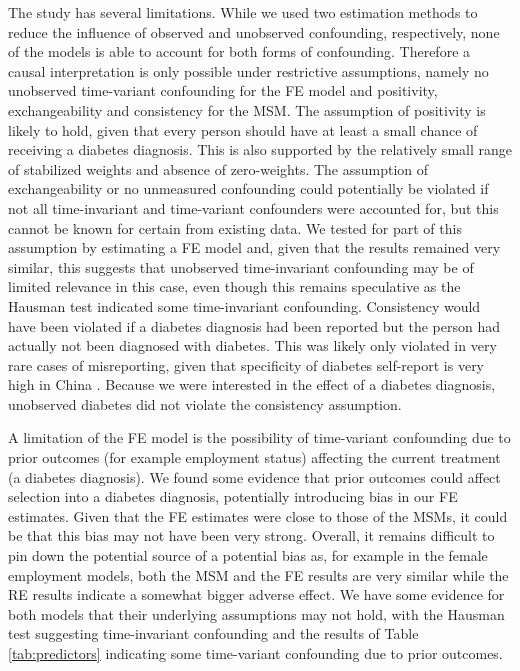 The study has several limitations. While we used two estimation methods to reduce the influence of observed and unobserved confounding, respectively, none of the models is able to account for both forms of confounding. Therefore a causal interpretation is only possible under restrictive assumptions, namely no unobserved time-variant confounding for the \ac{FE} model and positivity, exchangeability and consistency for the \ac{MSM}. The assumption of positivity is likely to hold, given that every person should have at least a small chance of receiving a diabetes diagnosis. This is also supported by the relatively small range of stabilized weights and absence of zero-weights. The assumption of exchangeability or no unmeasured confounding could potentially be violated if not all time-invariant and time-variant confounders were accounted for, but this cannot be known for certain from existing data. We tested for part of this assumption by estimating a \ac{FE} model and, given that the results remained very similar, this suggests that unobserved time-invariant confounding may be of limited relevance in this case, even though this remains speculative as the Hausman test indicated some time-invariant confounding. Consistency would have been violated if a diabetes diagnosis had been reported but the person had actually not been diagnosed with diabetes. This was likely only violated in very rare cases of misreporting, given that specificity of diabetes self-report is very high in China \autocite{Yuan2015}. Because we were interested in the effect of a diabetes diagnosis, unobserved diabetes did not violate the consistency assumption.

A limitation of the \ac{FE} model is the possibility of time-variant confounding due to prior outcomes (for example employment status) affecting the current treatment (a diabetes diagnosis). We found some evidence that prior outcomes could affect selection into a diabetes diagnosis, potentially introducing bias in our \ac{FE} estimates. Given that the \ac{FE} estimates were close to those of the \acp{MSM}, it could be that this bias may not have been very strong. Overall, it remains difficult to pin down the potential source of a potential bias as, for example in the female employment models, both the \ac{MSM} and the \ac{FE} results are very similar while the \ac{RE} results indicate a somewhat bigger adverse effect. We have some evidence for both models that their underlying assumptions may not hold, with the Hausman test suggesting time-invariant confounding and the results of Table \ref{tab:predictors} indicating some time-variant confounding due to prior outcomes.

